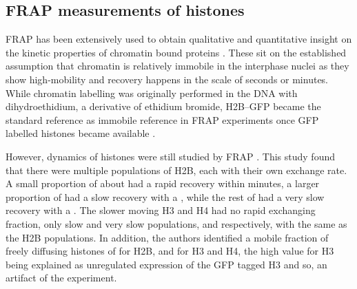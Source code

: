   \subsection{FRAP measurements of histones}

    FRAP has been extensively used to obtain qualitative and
    quantitative insight on the kinetic properties of chromatin bound
    proteins \citep{phair2000high, essers2005nuclear, agresti2005gr}.
    These sit on the established assumption that chromatin is
    relatively immobile in the interphase nuclei
    \citep{abney1997chromatin} as they show high-mobility and recovery
    happens in the scale of seconds or minutes.  While chromatin
    labelling was originally performed in the DNA with
    dihydroethidium, a derivative of ethidium bromide, H2B--GFP became
    the standard reference as immobile reference in FRAP experiments
    \citep{dey2000bromodomain} once GFP labelled histones became
    available \citep{KevinH2BGFP}.


    However, dynamics of histones were still studied by FRAP
    \citep{KimuraCook}.  This study found that there were multiple
    populations of H2B, each with their own exchange rate.  A small
    proportion of about  had a rapid recovery within minutes,
    a larger proportion of  had a slow recovery with a
    , while the rest of 
    had a very slow recovery with a \halflife[$>$\SI{510}{\min}].  The
    slower moving H3 and H4 had no rapid exchanging fraction, only
    slow and very slow populations,  and 
    respectively, with the same \halflife[] as the H2B populations.
    In addition, the authors identified a mobile fraction of freely
    diffusing histones of  for H2B, and  for H3 and
    H4, the high value for H3 being explained as unregulated
    expression of the GFP tagged H3 and so, an artifact of the
    experiment.


